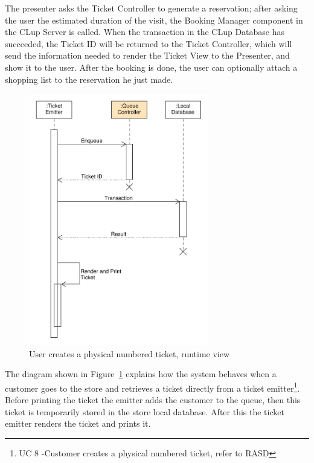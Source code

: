The presenter asks the Ticket Controller to generate a reservation; after asking the user the estimated duration of the visit, the Booking Manager component in the CLup Server is called.
When the transaction in the CLup Database has succeeded, the Ticket ID will be returned to the Ticket Controller, which will send the information needed to render the Ticket View to the Presenter, and show it to the user. After the booking is done, the user can optionally attach a shopping list to the reservation he just made. 
\begin{figure}[H]
    \includegraphics[width=0.7\textwidth]{Images/UML_paper_ticket_sequence.pdf}
    \caption{\label{fig:UML_paper_ticket_sequence}User creates a physical numbered ticket, runtime view}
\end{figure}
The diagram shown in Figure~\ref{fig:UML_paper_ticket_sequence} explains how the system behaves when a customer goes to the store and retrieves a ticket directly from a ticket emitter\footnote{UC 8 -Customer creates a physical numbered ticket, refer to RASD}. Before printing the ticket the emitter adds the customer to the queue, then this ticket is temporarily stored in the store local database. After this the ticket emitter renders the ticket and prints it.

